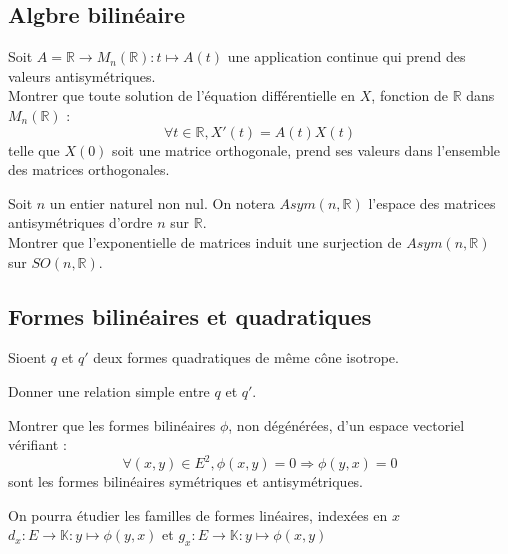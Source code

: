 
\subsection{Algbre bilin\'eaire}

\begin{exer}
Soit $A = \mathbb{R} \rightarrow M_n(\mathbb{R}) : t \mapsto A(t)$ une application continue qui prend des valeurs antisymétriques.\\
Montrer que toute solution de l'équation différentielle en $X$, fonction de $\mathbb{R}$ dans $M_n(\mathbb{R})$ :
\[\forall t \in \mathbb{R} , X'(t) = A(t)X(t)\]
telle que $X(0)$ soit une matrice orthogonale, prend ses valeurs dans l'ensemble des matrices orthogonales.
\end{exer}

\begin{exer}
Soit $n$ un entier naturel non nul. On notera $Asym(n,\mathbb{R})$ l'espace des matrices antisymétriques d'ordre $n$ %
sur $\mathbb{R}$.\\
Montrer que l'exponentielle de matrices induit une surjection de $Asym(n,\mathbb{R})$ sur $SO(n,\mathbb{R})$.
\end{exer}

\subsection{Formes bilin\'eaires et quadratiques}

\begin{exer}
Sioent $q$ et $q'$ deux formes quadratiques de même cône isotrope.

Donner une relation simple entre $q$ et $q'$.
\end{exer}

\begin{exer}
Montrer que les formes bilinéaires $\phi$, non dégénérées, d'un espace vectoriel vérifiant :
\[\forall (x,y) \in E^2, \phi (x,y) = 0 \Rightarrow \phi (y,x) = 0\]
sont les formes bilinéaires symétriques et antisymétriques.

\medskip
On pourra \'etudier les familles de formes lin\'eaires, indexées en $x$ 
$d_x : E \rightarrow \mathbb{K} : y \mapsto \phi(y,x)$ et $g_x : E \rightarrow \mathbb{K} : y \mapsto \phi(x,y)$
\end{exer}

